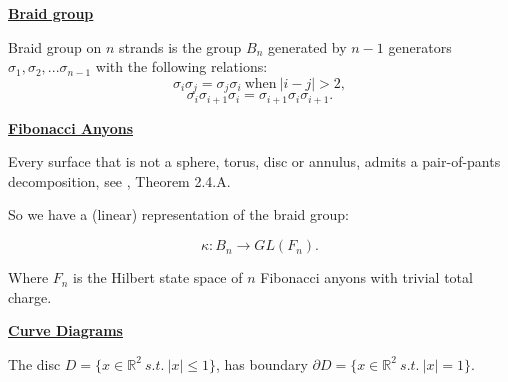 \documentclass[12pt,a4paper]{article}
\begin{document}
\maketitle

\def\Complex {C}
\def\tensor{\otimes}
\def\Tensor{\bigotimes}
\def\bra #1{\langle #1|}
\def\ket #1{|#1\rangle}
\def\braket #1#2{\langle #1|#2 \rangle}



\def\mathZ{\mathbb{Z}}
\def\mathR{\mathbb{R}}


\def\heading #1{\vskip 20pt \noindent\underline{\large \bf #1}\vskip 5pt}

\def\important #1{\underline{\bf #1}}

%

\heading{Braid group}

Braid group on $n$ strands is the group $B_n$ generated by $n-1$ generators
$\sigma_1, \sigma_2, ... \sigma_{n-1}$ with the following relations:
    $$ \sigma_i \sigma_j = \sigma_j \sigma_i \ \text{when}\ |i-j| > 2, $$
    $$ \sigma_i \sigma_{i+1} \sigma_i =  \sigma_{i+1} \sigma_i \sigma_{i+1}.$$



\heading{Fibonacci Anyons}

Every surface that is not a sphere, torus, disc or annulus, admits
a pair-of-pants decomposition, see \cite{Ivanov01}, Theorem 2.4.A.

So we have a (linear) representation of the braid group:

    $$ \kappa : B_n \to GL(F_n).$$

Where $F_n$ is the Hilbert state space of $n$ Fibonacci anyons with
trivial total charge.



\heading{Curve Diagrams}

The disc $D = \{ x\in \mathR^2\ s.t.\ |x|\leq 1 \} $,
has boundary $\partial D = \{ x\in \mathR^2\ s.t.\ |x|=1 \} $.
\end{document}
